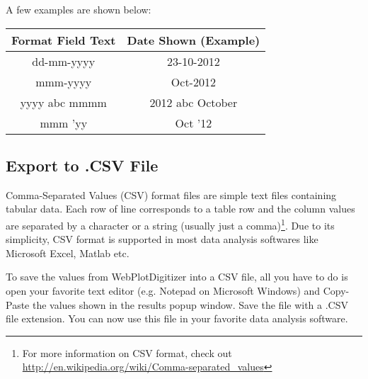 \documentclass[letterpaper, 10pt]{article}
\begin{document}
A few examples are shown below:

\begin{center}
\begin{tabular}{|c|c|}
\hline
Format Field Text & Date Shown (Example)\\
\hline
dd-mm-yyyy & 23-10-2012\\
mmm-yyyy & Oct-2012\\
yyyy abc mmmm & 2012 abc October\\
mmm 'yy & Oct '12\\
\hline
\end{tabular}
\end{center}

\subsection{Export to .CSV File}
Comma-Separated Values (CSV) format files are simple text files containing tabular data. Each row of line corresponds to a table row and the column values are separated by a character or a string (usually just a comma)\footnote{For more information on CSV format, check out \url{http://en.wikipedia.org/wiki/Comma-separated_values}}. Due to its simplicity, CSV format is supported in most data analysis softwares like Microsoft Excel, Matlab etc.

To save the values from WebPlotDigitizer into a CSV file, all you have to do is open your favorite text editor (e.g. Notepad on Microsoft Windows) and Copy-Paste the values shown in the results popup window. Save the file with a .CSV file extension. You can now use this file in your favorite data analysis software.
\end{document}
